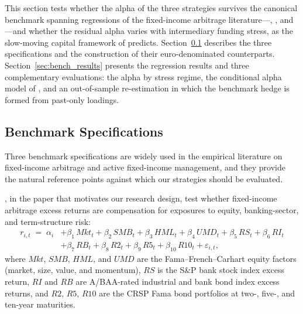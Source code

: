 


This section tests whether the alpha of the three strategies survives
the canonical benchmark spanning regressions of the fixed-income
arbitrage literature---\citet{duarte2007risk}, \citet{fung2004hedge},
and \citet{brooks2020active}---and whether the residual alpha varies
with intermediary funding stress, as the slow-moving capital framework
of \citet{duffie2010presidential} predicts.
Section~\ref{sec:bench_specs} describes the three specifications and
the construction of their euro-denominated counterparts.
Section~\ref{sec:bench_results} presents the regression results and
three complementary evaluations: the alpha by stress regime, the
conditional alpha model of \citet{christopherson1998conditioning}, and
an out-of-sample re-estimation in which the benchmark hedge is formed
from past-only loadings.



\subsection{Benchmark Specifications}
\label{sec:bench_specs}

Three benchmark specifications are widely used in the empirical
literature on fixed-income arbitrage and active fixed-income
management, and they provide the natural reference points against
which our strategies should be evaluated.

\citet{duarte2007risk}, in the paper that motivates our research
design, test whether fixed-income arbitrage excess returns are
compensation for exposures to equity, banking-sector, and
term-structure risk:
\begin{equation}\label{eq:duarte}
\begin{split}
  r_{i,t} \;=\; \alpha_i
  &+ \beta_1\,\textit{Mkt}_t + \beta_2\,\textit{SMB}_t
   + \beta_3\,\textit{HML}_t + \beta_4\,\textit{UMD}_t + \beta_5\,\textit{RS}_t + \beta_6\,\textit{RI}_t\\
  &+ \beta_7\,\textit{RB}_t + \beta_8\,\textit{R2}_t + \beta_9\,\textit{R5}_t
   + \beta_{10}\,\textit{R10}_t + \varepsilon_{i,t},
\end{split}
\end{equation}
where $\textit{Mkt}$, $\textit{SMB}$, $\textit{HML}$, and
$\textit{UMD}$ are the Fama--French--Carhart equity factors (market,
size, value, and momentum), $\textit{RS}$ is the S\&P bank stock index
excess return, $\textit{RI}$ and $\textit{RB}$ are A/BAA-rated
industrial and bank bond index excess returns, and $\textit{R2}$,
$\textit{R5}$, $\textit{R10}$ are the CRSP Fama bond portfolios at
two-, five-, and ten-year maturities.

